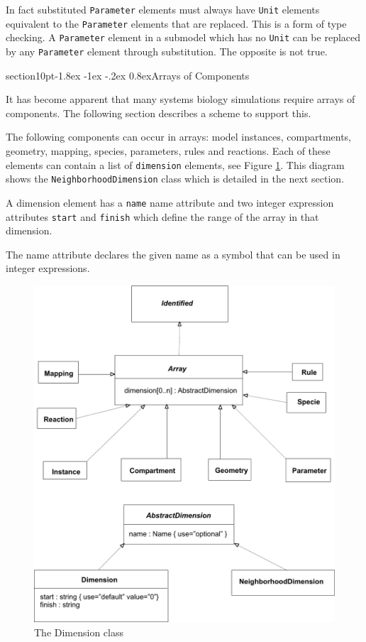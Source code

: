 \documentclass[10pt]{article}
\makeatletter
\renewcommand{\section}{\@startsection%
  {section}{1}{0pt}{-1.8ex \@plus -1ex \@minus -.2ex}%
  {0.8ex}{\normalfont\Large\bfseries\sffamily}}
\newcommand{\class}[1]{\texttt{#1}}
\newcommand{\attrib}[1]{\texttt{#1}}
\makeatother
\begin{document}
In fact substituted \class{Parameter} elements must always have
\class{Unit} elements equivalent to the \class{Parameter}
elements that are replaced. This is a form of type checking.
A \class{Parameter} element in a submodel which has no
\class{Unit} can be replaced by any \class{Parameter} element
through substitution.  The opposite is not true.

\section{Arrays of Components}

It has become apparent that many systems biology simulations
require arrays of components. The following section describes a
scheme to support this.

The following components can occur in arrays: model instances,
compartments, geometry, mapping, species, parameters, rules and
reactions. Each of these elements can contain a list of
\class{dimension} elements, see Figure \ref{fig:dimension}. This
diagram shows the \class{NeighborhoodDimension} class which is
detailed in the next section.

A dimension element has a \attrib{name} name attribute and two
integer expression attributes \attrib{start} and
\attrib{finish} which define the range of the array in that
dimension.

The name attribute declares the given name as a symbol that can
be used in integer expressions.

\begin{figure}

  \centering

  \includegraphics[scale = 0.75]{dimension}

  \caption{The Dimension class}

  \label{fig:dimension}

\end{figure}
\end{document}
